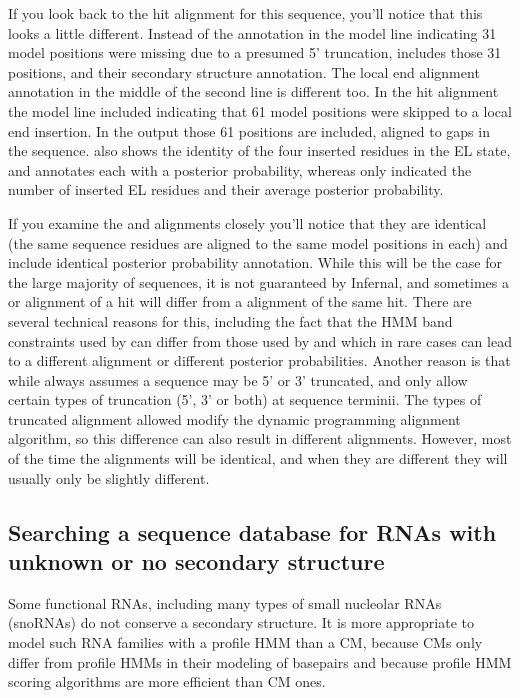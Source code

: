 If you look back to the  hit alignment for this sequence,
you'll notice that this looks a little different. Instead of the
\otext{<[31]*} annotation in the model line indicating 31 model
positions were missing due to a presumed 5' truncation, 
includes those 31 positions, and their secondary structure
annotation. The local end alignment annotation in the middle of the
second line is different too. In the  hit alignment the
model line included \otext{*[61]*} indicating that 61 model positions
were skipped to a local end insertion. In the  output
those 61 positions are included, aligned to gaps in the sequence. 
 also shows the identity of the four inserted residues
in the EL state, and annotates each with a posterior probability,
whereas  only indicated the number of inserted EL
residues and their average posterior probability. 

If you examine the  and  alignments closely
you'll notice that they are identical (the same sequence residues are
aligned to the same model positions in each) and include identical
posterior probability annotation. While this will be the case for the
large majority of sequences, it is not guaranteed by Infernal, and
sometimes a  or  alignment of a hit will
differ from a  alignment of the same hit. There are
several technical reasons for this, including the fact that the HMM
band constraints used by  can differ from those used by
 and  which in rare cases can lead to a
different alignment or different posterior probabilities. Another
reason is that while  always assumes a sequence may be
5' or 3' truncated,  and  only allow
certain types of truncation (5', 3' or both) at sequence
terminii. The types of truncated alignment allowed modify the
dynamic programming alignment algorithm, so this difference can also
result in different alignments. However, most of the time the
alignments will be identical, and when they are different they will
usually only be slightly different.

\subsection{Searching a sequence database for RNAs with unknown or no
 secondary structure}

Some functional RNAs, including many types of small nucleolar RNAs
(snoRNAs) do not conserve a secondary structure. It is more
appropriate to model such RNA families with a profile HMM than a CM,
because CMs only differ from profile HMMs in their modeling of
basepairs and because profile HMM scoring algorithms are more
efficient than CM ones.

